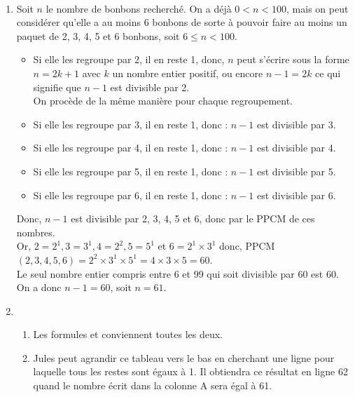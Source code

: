 \ \\ [-5mm]
\begin{enumerate}
   \item Soit $n$ le nombre de bonbons recherché. On a déjà $0<n<100$, mais on peut considérer qu'elle a au moins 6 bonbons de sorte à pouvoir faire au moins un paquet de 2, 3, 4, 5 et 6 bonbons, soit $6\leq n<100$.
   \begin{itemize}
      \item Si elle les regroupe par 2, il en reste 1, donc, $n$ peut s'écrire sous la forme $n =2k+1$ avec $k$ un nombre entier positif, ou encore $n-1 =2k$ ce qui signifie que $n-1$ est divisible par 2. \\
      On procède de la même manière pour chaque regroupement.
      \item Si elle les regroupe par 3, il en reste 1, donc : $n-1$ est divisible par 3.
      \item Si elle les regroupe par 4, il en reste 1, donc : $n-1$ est divisible par 4.
      \item Si elle les regroupe par 5, il en reste 1, donc : $n-1$ est divisible par 5.
      \item Si elle les regroupe par 6, il en reste 1, donc : $n-1$ est divisible par 6.
   \end{itemize}
   Donc, $n-1$ est divisible par 2, 3, 4, 5 et 6, donc par le PPCM de ces nombres. \\
   Or, $2 =2^1, 3 =3^1, 4 =2^2, 5 =5^1$ et $6 =2^1\times3^1$ donc, PPCM$(2,3,4,5,6) =2^2\times3^1\times5^1 =4\times3\times5 =60$. \\
   Le seul nombre entier compris entre 6 et 99 qui soit divisible par 60 est 60.  \\
   On a donc $n-1 =60$, soit $n =61$. 
   \item
   \begin{enumerate}
      \item Les formules  et  conviennent toutes les deux.
      \item Jules peut agrandir ce tableau vers le bas en cherchant une ligne pour laquelle tous les restes sont égaux à 1. Il obtiendra ce résultat en ligne 62 quand le nombre écrit dans la colonne A sera égal à 61.
   \end{enumerate}
\end{enumerate}

